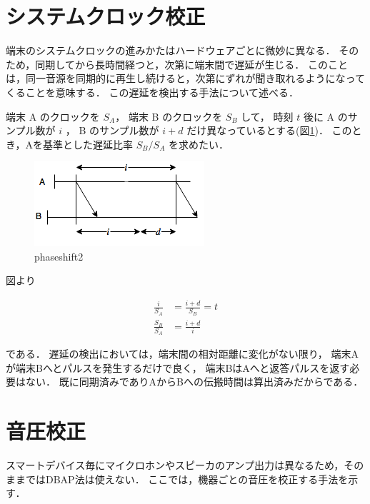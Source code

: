 
\section{システムクロック校正}

端末のシステムクロックの進みかたはハードウェアごとに微妙に異なる．
そのため，同期してから長時間経つと，次第に端末間で遅延が生じる．
このことは，同一音源を同期的に再生し続けると，次第にずれが聞き取れるようになってくることを意味する．
この遅延を検出する手法について述べる．

端末 A のクロックを $S_A$，
端末 B のクロックを $S_B$ して，
時刻 $t$ 後に
A のサンプル数が $i$ ，
B のサンプル数が $i+d$ だけ異なっているとする(図\ref{fig:phaseshift2})．
このとき，Aを基準とした遅延比率 $S_B/S_A$ を求めたい．

\begin{figure}[p]\centering
  \hspace{-2mm}\includegraphics[clip,width=1.1\hsize]{img/phase_shift2.png}
  \caption{phaseshift2}\label{fig:phaseshift2}
\end{figure}

図より

$$\begin{aligned}
\frac{i}{S_A} &= \frac{i+d}{S_B} = t \\
\frac{S_B}{S_A} &= \frac{i+d}{i}
\end{aligned}$$

である．
遅延の検出においては，端末間の相対距離に変化がない限り，
端末Aが端末Bへとパルスを発生するだけで良く，
端末BはAへと返答パルスを返す必要はない．
既に同期済みでありAからBへの伝搬時間は算出済みだからである．



\section{音圧校正}
スマートデバイス毎にマイクロホンやスピーカのアンプ出力は異なるため，そのままではDBAP法は使えない．
ここでは，機器ごとの音圧を校正する手法を示す．

